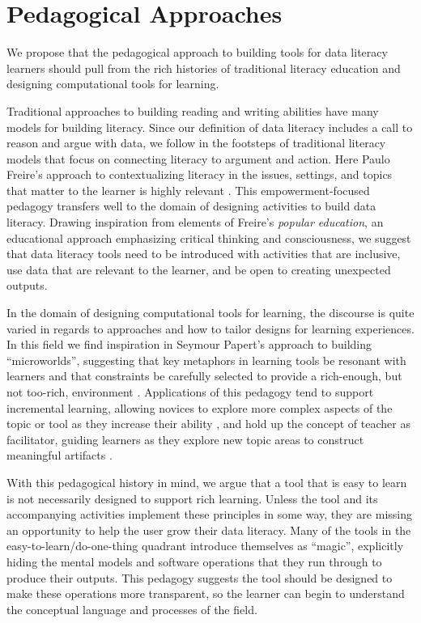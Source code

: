 \documentclass{acm_proc_article-sp}
\begin{document}
\section{Pedagogical Approaches}

We propose that the pedagogical approach to building tools for data literacy learners should pull from the rich histories of traditional literacy education and designing computational tools for learning.

Traditional approaches to building reading and writing abilities have many models for building literacy. Since our definition of data literacy includes a call to reason and argue with data, we follow in the footsteps of traditional literacy models that focus on connecting literacy to argument and action.  Here Paulo Freire's approach to contextualizing literacy in the issues, settings, and topics that matter to the learner is highly relevant \cite{freire_pedagogy_1968}.  This empowerment-focused pedagogy transfers well to the domain of designing activities to build  data literacy.  Drawing inspiration from elements of Freire's \emph{popular education}, an educational approach emphasizing critical thinking and consciousness, we suggest that data literacy tools need to be introduced with activities that are inclusive, use data that are relevant to the learner, and be open to creating unexpected outputs.

In the domain of designing computational tools for learning, the discourse is quite varied in regards to approaches and how to tailor designs for learning experiences. In this field we find inspiration in Seymour Papert's approach to building \enquote{microworlds}, suggesting that key metaphors in learning tools be resonant with learners and that constraints be carefully selected to provide a rich-enough, but not too-rich, environment \cite{papert_mindstorms:_1980}. Applications of this pedagogy tend to support incremental learning, allowing novices to explore more complex aspects of the topic or tool as they increase their ability \cite{dasgupta_learning_2012,huron_constructive_2014}, and hold up the concept of teacher as facilitator, guiding learners as they explore new topic areas to construct meaningful artifacts \cite{deahl_better_2014}.

With this pedagogical history in mind, we argue that a tool that is easy to learn is not necessarily designed to support rich learning. Unless the tool and its accompanying activities implement these principles in some way, they are missing an opportunity to help the user grow their data literacy. Many of the tools in the easy-to-learn/do-one-thing quadrant introduce themselves as \enquote{magic}, explicitly hiding the mental models and software operations that they run through to produce their outputs. This pedagogy suggests the tool should be designed to make these operations more transparent, so the learner can begin to understand the conceptual language and processes of the field.
\end{document}
